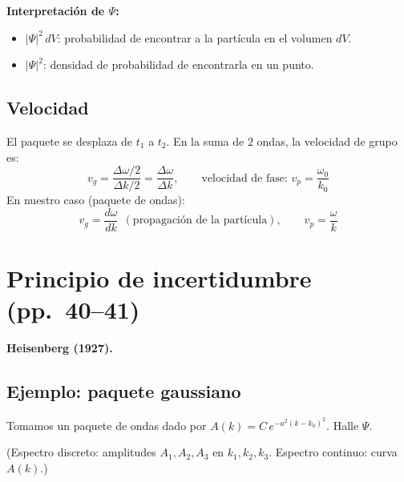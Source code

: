 \documentclass[11pt,a4paper]{article}
\newcommand{\pags}[1]{{\normalfont\small\color{gris}(pp.~#1)}}
\begin{document}
\textbf{Interpretación de $\Psi$:}
\begin{itemize}
  \item $|\Psi|^2\,dV$: probabilidad de encontrar a la partícula en el volumen $dV$.
  \item $|\Psi|^2$: densidad de probabilidad de encontrarla en un punto.
\end{itemize}

\subsection{Velocidad}
El paquete se desplaza de $t_1$ a $t_2$. En la suma de 2 ondas, la velocidad de grupo es:
\[
v_g=\frac{\Delta\omega/2}{\Delta k/2}=\frac{\Delta\omega}{\Delta k},\qquad \text{velocidad de fase: } v_p=\frac{\omega_0}{k_0}
\]
En nuestro caso (paquete de ondas):
\[
v_g=\frac{d\omega}{dk}\ \ (\text{propagación de la partícula}),\qquad v_p=\frac{\omega}{k}
\]

\section{Principio de incertidumbre \pags{40--41}}

\textbf{Heisenberg (1927).}

\subsection{Ejemplo: paquete gaussiano}
Tomamos un paquete de ondas dado por $A(k)=C\,e^{-a^2(k-k_0)^2}$. Halle $\Psi$.

(Espectro discreto: amplitudes $A_1,A_2,A_3$ en $k_1,k_2,k_3$. Espectro continuo: curva $A(k)$.)
\end{document}
